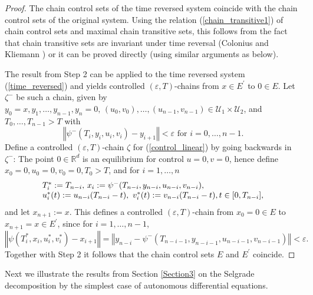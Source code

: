 \begin{proof}
		The chain control sets of the time reversed system coincide with the chain
		control sets of the original system. Using the relation
		(\ref{chain_transitive1}) of chain control sets and maximal chain transitive
		sets, this follows from the fact that chain transitive sets are invariant
		under time reversal (Colonius and Kliemann \cite[Proposition 3.1.13(ii)]%
		{ColK14}) or it can be proved directly (using similar arguments as below).
		
		The result from Step 2 can be applied to the time reversed system
		(\ref{time_reversed}) and yields controlled $(\varepsilon,T)$-chains from
		$x\in E^{\prime}$ to $0\in E$. Let $\zeta^{-}$ be such a chain, given by
		$y_{0}=x,y_{1},\ldots,y_{n-1},y_{n}=0,\,(u_{0},v_{0}),\ldots,(u_{n-1}%
		,v_{n-1})\in\mathcal{U}_{1}\times\mathcal{U}_{2}$, and $T_{0},\ldots
		,T_{n-1}>T$ with
		\[
		\left\Vert \psi^{-}(T_{i},y_{i},u_{i},v_{i})-y_{i+1}\right\Vert <\varepsilon
		\mbox{ for }i=0,\ldots,n-1.
		\]
		Define a controlled $(\varepsilon,T)$-chain $\zeta$ for (\ref{control_linear})
		by going backwards in $\zeta^{-}$: The point $0\in\mathbb{R}^{d}$ is an
		equilibrium for control $u=0,v=0$, hence define $x_{0}=0,u_{0}=0,v_{0}%
		=0,T_{0}>T$, and for $i=1,\ldots,n$
		\[%
		\begin{array}
			[c]{l}%
			T_{i}^{\ast}:=T_{n-i},\,x_{i}:=\psi^{-}(T_{n-i},y_{n-i},u_{n-i},v_{n-i}%
			),\label{rev2}\\
			u_{i}^{\ast}(t):=u_{n-i}(T_{n-i}-t),\,\,v_{i}^{\ast}(t):=v_{n-i}%
			(T_{n-i}-t),t\in\lbrack0,T_{n-i}],
		\end{array}
		\]
		and let $x_{n+1}:=x$. This defines a controlled $(\varepsilon,T)$-chain from
		$x_{0}=0\in E$ to $x_{n+1}=x\in E^{\prime}$, since for $i=1,\ldots,n-1$,
		\[
		\left\Vert \psi(T_{i}^{\ast},x_{i},u_{i}^{\ast},v_{i}^{\ast})-x_{i+1}%
		\right\Vert =\left\Vert y_{n-i}-\psi^{-}(T_{n-i-1},y_{n-i-1},u_{n-i-1}%
		,v_{n-i-1})\right\Vert <\varepsilon.
		\]
		Together with Step 2 it follows that the chain control sets $E$ and
		$E^{\prime}$ coincide.
	\end{proof}
	
	Next we illustrate the results from Section \ref{Section3} on the Selgrade
	decomposition by the simplest case of autonomous differential equations.
	
